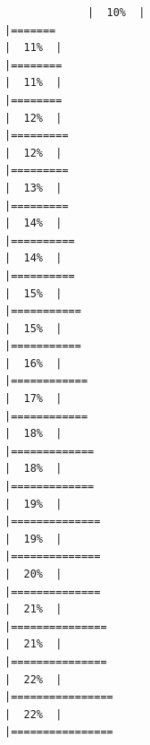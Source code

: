 \documentclass[
]{article}
\begin{document}
\begin{verbatim}
             |  10%  |                                                                              |=======                                                               |  11%  |                                                                              |========                                                              |  11%  |                                                                              |========                                                              |  12%  |                                                                              |=========                                                             |  12%  |                                                                              |=========                                                             |  13%  |                                                                              |=========                                                             |  14%  |                                                                              |==========                                                            |  14%  |                                                                              |==========                                                            |  15%  |                                                                              |===========                                                           |  15%  |                                                                              |===========                                                           |  16%  |                                                                              |============                                                          |  17%  |                                                                              |============                                                          |  18%  |                                                                              |=============                                                         |  18%  |                                                                              |=============                                                         |  19%  |                                                                              |==============                                                        |  19%  |                                                                              |==============                                                        |  20%  |                                                                              |==============                                                        |  21%  |                                                                              |===============                                                       |  21%  |                                                                              |===============                                                       |  22%  |                                                                              |================                                                      |  22%  |                                                                              |================                                          
\end{verbatim}
\end{document}
